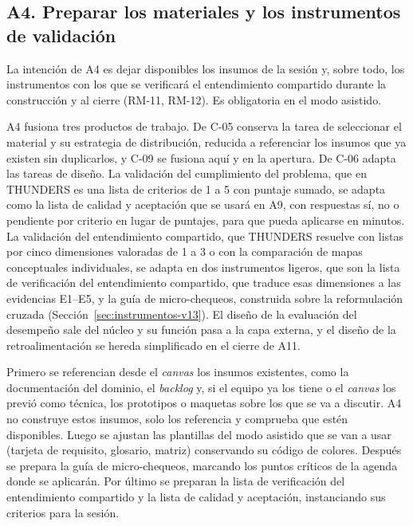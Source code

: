 \documentclass[12pt,letterpaper,oneside]{report}
\begin{document}
\subsection{A4. Preparar los materiales y los instrumentos de validación}
La intención de A4 es dejar disponibles los insumos de la sesión y, sobre todo,
los instrumentos con los que se verificará el entendimiento compartido durante la
construcción y al cierre (RM-11, RM-12). Es obligatoria en el modo asistido.

A4 fusiona tres productos de trabajo. De C-05 conserva la tarea de seleccionar el
material y su estrategia de distribución, reducida a referenciar los insumos
que ya existen sin duplicarlos, y C-09 se fusiona aquí y en la apertura. De C-06
adapta las tareas de diseño. La validación del cumplimiento del problema, que
en THUNDERS es una lista de criterios de 1 a 5 con puntaje sumado, se adapta
como la lista de calidad y aceptación que se usará en A9, con respuestas sí, no
o pendiente por criterio en lugar de puntajes, para que pueda aplicarse en
minutos. La validación del entendimiento compartido, que THUNDERS resuelve con
listas por cinco dimensiones valoradas de 1 a 3 o con la comparación de mapas
conceptuales individuales, se adapta en dos instrumentos ligeros, que son la
lista de verificación del entendimiento compartido, que traduce esas dimensiones a las
evidencias E1--E5, y la guía de micro-chequeos, construida sobre la
reformulación cruzada (Sección~\ref{sec:instrumentos-v13}). El diseño de la
evaluación del desempeño sale del núcleo y su función pasa a la capa externa, y
el diseño de la retroalimentación se hereda simplificado en el cierre de A11.

Primero se referencian desde el \textit{canvas} los insumos existentes, como la
documentación del dominio, el \textit{backlog} y, si el equipo ya los tiene o el
\textit{canvas} los previó como técnica, los prototipos o maquetas sobre los que
se va a discutir. A4 no construye estos insumos, solo los referencia y comprueba
que estén disponibles. Luego se ajustan las plantillas del modo asistido que se
van a usar (tarjeta de requisito, glosario, matriz) conservando su código de
colores. Después se prepara la guía de micro-chequeos, marcando los puntos
críticos de la agenda donde se aplicarán. Por último se preparan la lista de
verificación del entendimiento compartido y la lista de calidad y aceptación,
instanciando sus criterios para la sesión.
\end{document}
